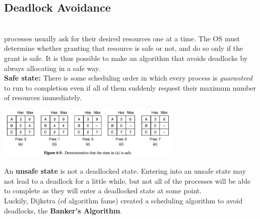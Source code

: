 \documentclass{article}
\begin{document}
\subsection*{Deadlock Avoidance}
\\processes usually ask for their desired resources one at a time. The OS must determine whether granting that resource is safe or not, and do so only if the grant is safe. It is thus possible to make an algorithm that avoids deadlocks by always allocating in a safe way.
\\\textbf{Safe state:} There is some scheduling order in which every process is \textit{guaranteed} to run to completion even if all of them suddenly request their maximum number of resources immediately.
\begin{center}
\includegraphics[width= 250pt]{tex/ch6/6-9.png}
\end{center}
An \textbf{unsafe state} is not a deadlocked state. Entering into an unsafe state may not lead to a deadlock for a little while, but not all of the processes will be able to complete as they will enter a deadlocked state at some point.
\\Luckily, Dijkstra (of algorithm fame) created a scheduling algorithm to avoid deadlocks, the \textbf{Banker's Algorithm}.
\end{document}
